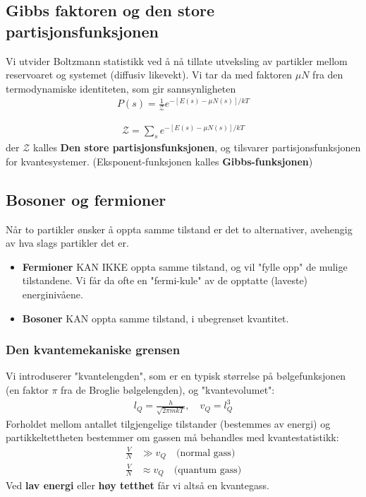 \documentclass[10pt,a4paper]{article}
\renewcommand{\exp}{e^}
\renewcommand{\b}{\textbf}
\begin{document}
\begin{multicols}{2}
\subsection*{Gibbs faktoren og den store partisjonsfunksjonen}
\begin{framed}
Vi utvider Boltzmann statistikk ved å nå tillate utveksling av partikler mellom reservoaret og systemet (diffusiv likevekt). Vi tar da med faktoren $\mu N$ fra den termodynamiske identiteten, som gir sannsynligheten
\begin{align*}
	P(s) = \frac{1}{\mathcal{Z}}\exp{-[E(s) - \mu N(s)]/kT}
\end{align*}

\begin{align*}
	\mathcal{Z} = \sum\limits_s \exp{-[E(s) - \mu N(s)]/kT}
\end{align*}
der $\mathcal{Z}$ kalles \b{Den store partisjonsfunksjonen}, og tilsvarer partisjonsfunksjonen for kvantesystemer. (Eksponent-funksjonen kalles \b{Gibbs-funksjonen})
\end{framed}


\subsection*{Bosoner og fermioner}
\begin{framed}
Når to partikler ønsker å oppta samme tilstand er det to alternativer, avehengig av hva slags partikler det er.
\begin{itemize}
	\item \b{Fermioner} KAN IKKE oppta samme tilstand, og vil "fylle opp" de mulige tilstandene. Vi får da ofte en "fermi-kule" av de opptatte (laveste) energinivåene. 
	\item \b{Bosoner} KAN oppta samme tilstand, i ubegrenset kvantitet.
\end{itemize}
\end{framed}
\newpage


\subsubsection*{Den kvantemekaniske grensen}
\begin{framed}
Vi introduserer "kvantelengden", som er en typisk størrelse på bølgefunksjonen (en faktor $\pi$ fra de Broglie bølgelengden), og "kvantevolumet":
\begin{align*}
	l_Q = \frac{h}{\sqrt{2\pi mkT}}, \quad v_Q = l_Q^3
\end{align*}
Forholdet mellom antallet tilgjengelige tilstander (bestemmes av energi) og partikkeltettheten bestemmer om gassen må behandles med kvantestatistikk:
\begin{align*}
	\frac{V}{N} &\gg v_Q \quad \text{(normal gass)} \\
	\frac{V}{N} &\approx v_Q \quad \text{(quantum gass)}
\end{align*}
Ved \b{lav energi} eller \b{høy tetthet} får vi altså en kvantegass.
\end{framed}



\end{multicols}
\end{document}
